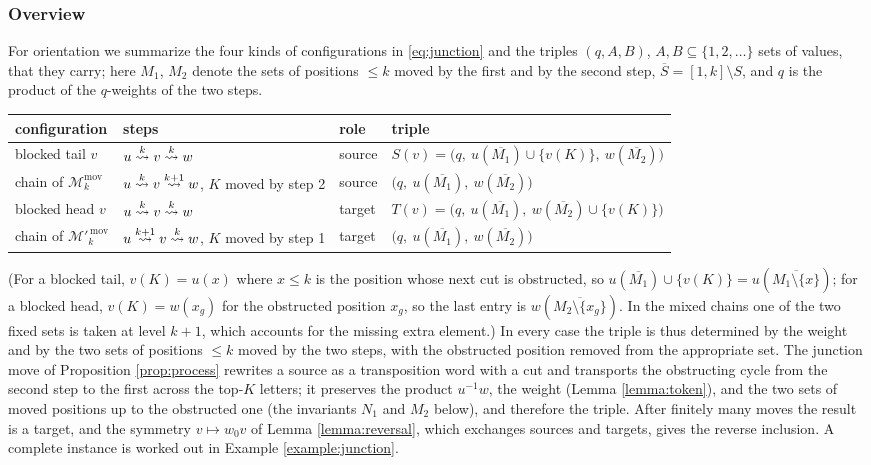 \documentclass{amsart}
\theoremstyle{definition}
\theoremstyle{remark}
\numberwithin{equation}{section}
\newcommand{\xrightsquigarrow}[2][]{%
	\mathrel{\mathop{\rightsquigarrow}\limits^{\scriptstyle #2}%
	\ifx\hfuzz#1\hfuzz\else_{\scriptstyle #1}\fi}%
}
\newcommand{\tom}[1]{\ensuremath{\xrightsquigarrow{#1}}}
\begin{document}
\subsubsection*{Overview}
For orientation we summarize the four kinds of configurations in \eqref{eq:junction} and the triples $(q,A,B)$, $A,B\subseteq\{1,2,\ldots\}$ sets of values, that they carry; here $M_1$, $M_2$ denote the sets of positions $\leq k$ moved by the first and by the second step, $\overline S=[1,k]\setminus S$, and $q$ is the product of the $q$-weights of the two steps.
\begin{center}
\begin{tabular}{llll}
configuration & steps & role & triple\\\hline
blocked tail $v$ & $u\tom kv\tom kw$ & source & $S(v)=\big(q,\ u(\overline{M_1})\cup\{v(K)\},\ w(\overline{M_2})\big)$\\
chain of $\mathcal M_k^{\mathrm{mov}}$ & $u\tom kv\tom{k+1}w$, $K$ moved by step 2 & source & $\big(q,\ u(\overline{M_1}),\ w(\overline{M_2})\big)$\\
blocked head $v$ & $u\tom kv\tom kw$ & target & $T(v)=\big(q,\ u(\overline{M_1}),\ w(\overline{M_2})\cup\{v(K)\}\big)$\\
chain of $\mathcal M'^{\,\mathrm{mov}}_k$ & $u\tom{k+1}v\tom kw$, $K$ moved by step 1 & target & $\big(q,\ u(\overline{M_1}),\ w(\overline{M_2})\big)$
\end{tabular}
\end{center}
(For a blocked tail, $v(K)=u(x)$ where $x\leq k$ is the position whose next cut is obstructed, so $u(\overline{M_1})\cup\{v(K)\}=u(\overline{M_1\setminus\{x\}})$; for a blocked head, $v(K)=w(x_g)$ for the obstructed position $x_g$, so the last entry is $w(\overline{M_2\setminus\{x_g\}})$. In the mixed chains one of the two fixed sets is taken at level $k+1$, which accounts for the missing extra element.) In every case the triple is thus determined by the weight and by the two sets of positions $\leq k$ moved by the two steps, with the obstructed position removed from the appropriate set. The junction move of Proposition \ref{prop:process} rewrites a source as a transposition word with a cut and transports the obstructing cycle from the second step to the first across the top-$K$ letters; it preserves the product $u^{-1}w$, the weight (Lemma \ref{lemma:token}), and the two sets of moved positions up to the obstructed one (the invariants $N_1$ and $M_2$ below), and therefore the triple. After finitely many moves the result is a target, and the symmetry $v\mapsto w_0v$ of Lemma \ref{lemma:reversal}, which exchanges sources and targets, gives the reverse inclusion. A complete instance is worked out in Example \ref{example:junction}.
\end{document}
